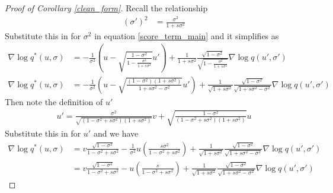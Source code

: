\documentclass[11pt]{article}
\theoremstyle{proposition}
\theoremstyle{lemma}
\theoremstyle{corollary}
\theoremstyle{theorem}
\theoremstyle{definition}
\begin{document}
\begin{proof}[Proof of Corollary \ref{clean_form}]
Recall the relationship
\begin{align}
    (\sigma')^{2}&= \frac{\sigma^{2}}{1+s\sigma^{2}}
\end{align}
Substitute this in for $\sigma^{2}$ in equation \ref{score_term_main} and it simplifies as
\begin{align}
 \nabla \log q^{*}(u,\sigma)&= -\frac{1}{\sigma^{2}}(u- \sqrt{\frac{1-\sigma^{2}}{1- \frac{\sigma^{2}}{1+s \sigma^{2}}}}u')+\frac{1}{1+s \sigma^{2}}\frac{\sqrt{1-\sigma^{2}}}{\sqrt{1-\frac{\sigma^{2}}{1+s \sigma^{2}}}}\nabla \log q(u',\sigma')\\
 \nabla \log q^{*}(u,\sigma)&= -\frac{1}{\sigma^{2}}(u- \sqrt{\frac{(1-\sigma^{2})(1+s\sigma^{2})}{1+s \sigma^{2}- \sigma^{2}}}u')+\frac{1}{\sqrt{1+s \sigma^{2}}}\frac{\sqrt{1-\sigma^{2}}}{\sqrt{1+s \sigma^{2}-\sigma^{2}}}\nabla \log q(u',\sigma')
\end{align}
Then note the definition of $u'$
\begin{align}
    u'=\frac{\sigma^{2}}{\sqrt{(1-\sigma^{2}+s \sigma^{2})(1+s \sigma^{2})}} v+ \sqrt{\frac{1-\sigma^{2}}{(1-\sigma^{2}+s \sigma^{2})(1+s \sigma^{2})}} u
\end{align}
Substitute this in for $u'$ and we have
\begin{align}
     \nabla \log q^{*}(u,\sigma)&=v \frac{\sqrt{1-\sigma^{2}}}{1-\sigma^{2}+s\sigma^{2}}-\frac{1}{\sigma^{2}}u (\frac{s \sigma^{2}}{1-\sigma^{2}+s \sigma^{2}})+\frac{1}{\sqrt{1+s \sigma^{2}}}\frac{\sqrt{1-\sigma^{2}}}{\sqrt{1+s \sigma^{2}-\sigma^{2}}}\nabla \log q(u',\sigma') \\
 &=  v \frac{\sqrt{1-\sigma^{2}}}{1-\sigma^{2}+s\sigma^{2}}-u (\frac{s}{1-\sigma^{2}+s \sigma^{2}})+\frac{1}{\sqrt{1+s \sigma^{2}}}\frac{\sqrt{1-\sigma^{2}}}{\sqrt{1+s \sigma^{2}-\sigma^{2}}}\nabla \log q(u',\sigma')
\end{align}
\end{proof}
\end{document}
